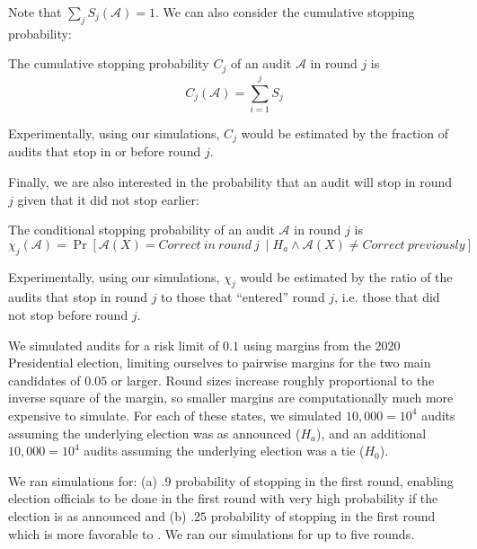 Note that $\sum _j S_j(\mathcal{A})=1$. We can also consider the cumulative stopping probability: 
\begin{definition}
The cumulative stopping probability $C_j$ of an audit $\mathcal{A}$ in round $j$ is 
$$C_j(\mathcal{A})= \sum_{i=1}^j S_j$$
\end{definition}
Experimentally, using our simulations, $C_j$ would be estimated by the fraction of audits that stop in or before round $j$. 

Finally, we are also interested in the probability that an audit will stop in round $j$ given that it did not stop earlier: 
\begin{definition}
The conditional stopping probability  of an audit $\mathcal{A}$ in round $j$ is 
$$\chi_j (\mathcal{A})=\Pr[\mathcal{A}(X)=Correct ~in~round~j~\mid H_a \land \mathcal{A}(X) \neq Correct ~previously]$$
\end{definition}
Experimentally, using our simulations, $\chi_j$ would be estimated by the ratio of the audits that stop in round $j$ to those that ``entered'' round $j$, i.e. those that did not stop before round $j$. 

We simulated audits for a risk limit of $0.1$ using margins from the 2020 Presidential election, limiting ourselves to pairwise margins for the two main candidates of $0.05$ or larger. Round sizes increase roughly proportional to the inverse
square of the margin, so 
smaller margins are computationally much more expensive to simulate.
For each of these states, we simulated 
$10,000=10^4$ audits assuming the underlying election was as announced ($H_a$),  
and an additional $10,000=10^4$ audits assuming the underlying election was a tie ($H_0$). 

We ran simulations for: (a) $.9$ probability of stopping in the first round, enabling election officials to be done in the first round with very high probability if the election is as announced and (b) $.25$ probability of stopping in the first round which is more favorable to \BRAVO. We ran our simulations for up to five rounds. 


